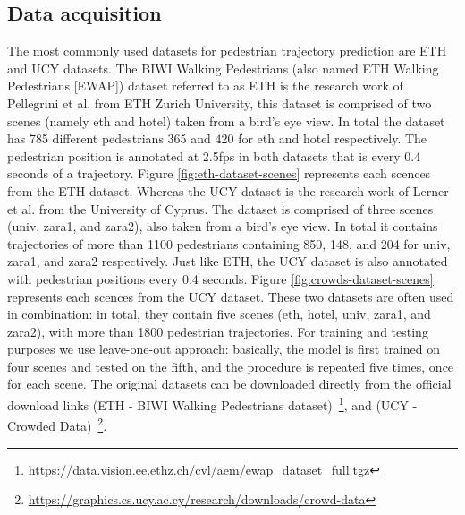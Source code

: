 \subsection{Data acquisition}
The most commonly used datasets for pedestrian trajectory prediction are ETH and UCY datasets.
The BIWI Walking Pedestrians (also named ETH Walking Pedestrians [EWAP]) dataset referred to as ETH \cite[]{ETH-biwi} is the research work of Pellegrini et al. from ETH Zurich University, this dataset is comprised of two scenes (namely eth and hotel) taken from a bird's eye view. In total the dataset has 785 different pedestrians 365 and 420 for eth and hotel respectively. The pedestrian position is annotated at 2.5fps in both datasets that is every 0.4 seconds of a trajectory. Figure \ref{fig:eth-dataset-scenes} represents each scences from the ETH dataset.\newline
Whereas the UCY dataset \cite[]{UCY-crowds} is the research work of Lerner et al. from the University of Cyprus. The dataset is comprised of three scenes (univ, zara1, and zara2), also taken from a bird's eye view. In total it contains trajectories of more than 1100 pedestrians containing 850, 148, and 204 for univ, zara1, and zara2 respectively. Just like ETH, the UCY dataset is also annotated with pedestrian positions every 0.4 seconds. Figure \ref{fig:crowds-dataset-scenes} represents each scences from the UCY dataset.\newline
These two datasets are often used in combination: in total, they contain five scenes (eth, hotel, univ, zara1, and zara2), with more than 1800 pedestrian trajectories. For training and testing purposes we use leave-one-out approach: basically, the model is first trained on four scenes and tested on the fifth, and the procedure is repeated five times, once for each scene.\newline 
The original datasets can be downloaded directly from the official download links (ETH - BIWI Walking Pedestrians dataset)~\footnote{\label{fn:eth-dataset}\url{https://data.vision.ee.ethz.ch/cvl/aem/ewap_dataset_full.tgz}}, and (UCY - Crowded Data)~\footnote{\label{fn:ucy-dataset}\url{https://graphics.cs.ucy.ac.cy/research/downloads/crowd-data}}.

